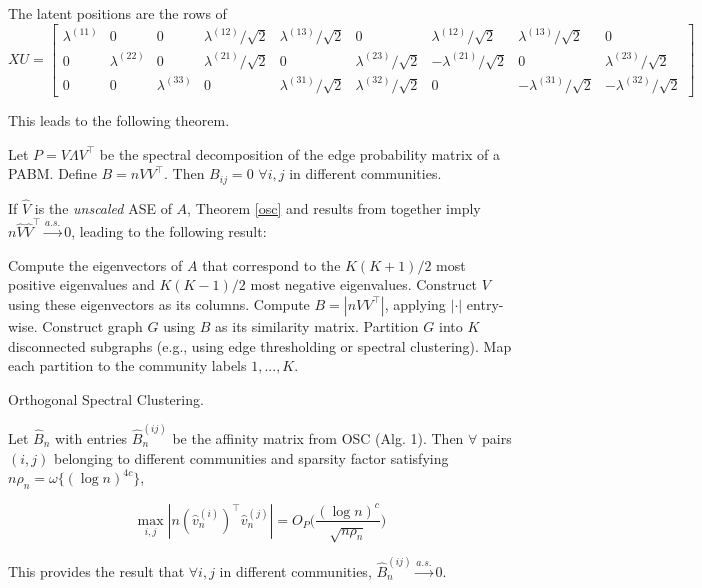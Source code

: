 \documentclass[
  11pt,
]{article}
\begin{document}
\begin{example}[$K = 3$]
The latent positions are the rows of  
$$XU = \begin{bmatrix}
  \lambda^{(11)} & 0 & 0 & 
  \lambda^{(12)} / \sqrt{2} & \lambda^{(13)} / \sqrt{2} & 0 & 
  \lambda^{(12)} / \sqrt{2} & \lambda^{(13)} / \sqrt{2} & 0 \\
  0 & \lambda^{(22)} & 0 & 
  \lambda^{(21)} / \sqrt{2} & 0 & \lambda^{(23)} / \sqrt{2} & 
  -\lambda^{(21)} / \sqrt{2} & 0 & \lambda^{(23)} / \sqrt{2} \\
  0 & 0 & \lambda^{(33)} & 
  0 & \lambda^{(31)} / \sqrt{2} & \lambda^{(32)} / \sqrt{2} & 
  0 & -\lambda^{(31)} / \sqrt{2} & -\lambda^{(32)} / \sqrt{2}
\end{bmatrix}$$
\end{example}

This leads to the following theorem.

\begin{theorem}
\label{osc}
Let $P = V \Lambda V^\top$ be the spectral decomposition of the edge probability matrix of a PABM. Define $B = n V V^\top$. Then $B_{ij} = 0$ $\forall i, j$ in different communities. 
\end{theorem}

If \(\hat{V}\) is the \emph{unscaled} ASE of \(A\), Theorem \ref{osc}
and results from \citeauthor{rubindelanchy2017statistical} together
imply \(n \hat{V} \hat{V}^\top \stackrel{a.s.}{\to} 0\), leading to the
following result:

\begin{algorithm}[t]
  \DontPrintSemicolon
  \SetAlgoLined
    Compute the eigenvectors of $A$ that correspond to the $K (K+1) / 2$ most 
    positive eigenvalues and $K (K-1) / 2$ most negative eigenvalues. Construct 
    $V$ using these eigenvectors as its columns.\;
    Compute $B = |n V V^\top|$, applying $|\cdot|$ entry-wise.\;
    Construct graph $G$ using $B$ as its similarity matrix.\;
    Partition $G$ into $K$ disconnected subgraphs  
    (e.g., using edge thresholding or spectral clustering).\;
    Map each partition to the community labels $1, ..., K$.\;
  \caption{Orthogonal Spectral Clustering.}
\end{algorithm}

\begin{theorem}
\label{theorem4} 
Let $\hat{B}_n$ with entries $\hat{B}_n^{(ij)}$ be the affinity matrix from OSC 
(Alg. 1). Then $\forall$ pairs $(i, j)$ belonging to different communities 
and sparsity factor satisfying $n \rho_n = \omega\{(\log n)^{4c}\}$, 

\begin{equation} \label{eq:thm4}
\max_{i, j} |n (\hat{v}_n^{(i)})^\top \hat{v}_n^{(j)}| = 
O_P \Big( \frac{(\log n)^c}{\sqrt{n \rho_n}} \Big)
\end{equation}

This provides the result that $\forall i, j$ in different communities, 
$\hat{B}_n^{(ij)} \stackrel{a.s.}{\to} 0$.
\end{theorem}
\end{document}
